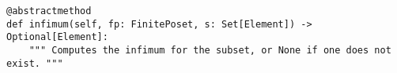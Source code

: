\begin{verbatim}
@abstractmethod
def infimum(self, fp: FinitePoset, s: Set[Element]) -> Optional[Element]:
    """ Computes the infimum for the subset, or None if one does not exist. """
\end{verbatim}